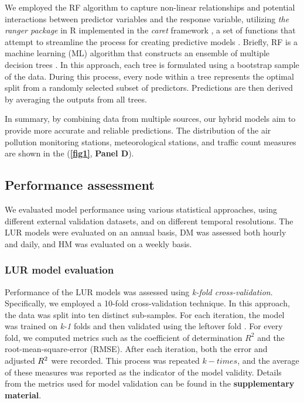 \documentclass{article}
\begin{document}
We employed the RF algorithm to capture non-linear relationships and potential interactions between predictor variables and the response variable, utilizing \textit{the ranger package} in R implemented in the \textit{caret} framework \cite{wright2019}, a set of functions that attempt to streamline the process for creating predictive models \cite{caret2008}. Briefly, RF is a machine learning (ML) algorithm that constructs an ensemble of multiple decision trees \cite{breiman2001}. In this approach, each tree is formulated using a bootstrap sample of the data. During this process, every node within a tree represents the optimal split from a randomly selected subset of predictors. Predictions are then derived by averaging the outputs from all trees.

In summary, by combining data from multiple sources, our hybrid models aim to provide more accurate and reliable predictions. The distribution of the air pollution monitoring stations, meteorological stations, and traffic count measures are shown in the (\textbf{\cref{fig1}}, \textbf{Panel D}). 

\subsection{Performance assessment}

We evaluated model performance using various statistical approaches, using different external validation datasets, and on different temporal resolutions. The LUR models were evaluated on an annual basis, DM was assessed both hourly and daily, and HM was evaluated on a weekly basis.

\subsubsection{LUR model evaluation}
Performance of the LUR models was assessed using \textit{k-fold cross-validation}. Specifically, we employed a 10-fold cross-validation technique. In this approach, the data was split into ten distinct sub-samples. For each iteration, the model was trained on \textit{k-1} folds and then validated using the leftover fold \cite{ziegel2003}. For every fold, we computed metrics such as the coefficient of determination \(R^2\) and the root-mean-square-error (RMSE). After each iteration, both the error and adjusted \(R\textsuperscript{2}\) were recorded. This process was repeated \(k-times\), and the average of these measures was reported as the indicator of the model validity. Details from the metrics used for model validation can be found in the \textbf{supplementary material}.\\
\end{document}
